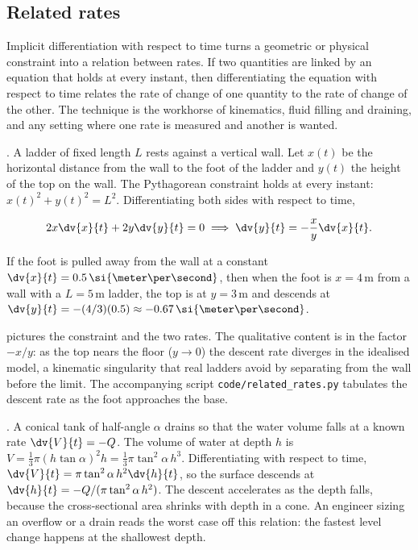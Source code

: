 \subsection{Related rates}

Implicit differentiation with respect to time turns a geometric or
physical constraint into a relation between rates. If two
quantities are linked by an equation that holds at every instant,
then differentiating the equation with respect to time relates the
rate of change of one quantity to the rate of change of the other.
The technique is the workhorse of kinematics, fluid filling and
draining, and any setting where one rate is measured and another
is wanted.

. A ladder of fixed length $L$ rests
against a vertical wall. Let $x(t)$ be the horizontal distance from
the wall to the foot of the ladder and $y(t)$ the height of the
top on the wall. The Pythagorean constraint holds at every instant:
$x(t)^{2} + y(t)^{2} = L^{2}$. Differentiating both sides with
respect to time,

\[
2 x \dv{x}{t} + 2 y \dv{y}{t} = 0 \implies \dv{y}{t} = -\frac{x}{y}
\dv{x}{t}.
\]

If the foot is pulled away from the wall at a constant
$\dv{x}{t} = 0.5 \,\si{\meter\per\second}$, then when the foot is
$x = 4 \,\si{\meter}$ from a wall with a $L = 5 \,\si{\meter}$
ladder, the top is at $y = 3 \,\si{\meter}$ and descends at
$\dv{y}{t} = -(4/3)(0.5) \approx -0.67 \,\si{\meter\per\second}$.



 pictures the constraint and the
two rates. The qualitative content is in the factor $-x/y$: as the
top nears the floor ($y \to 0$) the descent rate diverges in the
idealised model, a kinematic singularity that real ladders avoid by
separating from the wall before the limit. The accompanying script
\texttt{code/related\_rates.py} tabulates the descent rate as the
foot approaches the base.

. A conical tank of half-angle $\alpha$
drains so that the water volume falls at a known rate $\dv{V}{t} =
-Q$. The volume of water at depth $h$ is $V = \tfrac{1}{3} \pi
(h \tan\alpha)^{2} h = \tfrac{1}{3} \pi \tan^{2}\alpha \, h^{3}$.
Differentiating with respect to time, $\dv{V}{t} = \pi \tan^{2}
\alpha \, h^{2} \dv{h}{t}$, so the surface descends at $\dv{h}{t} =
-Q / (\pi \tan^{2}\alpha \, h^{2})$. The descent accelerates as the
depth falls, because the cross-sectional area shrinks with depth in
a cone. An engineer sizing an overflow or a drain reads the worst
case off this relation: the fastest level change happens at the
shallowest depth.

